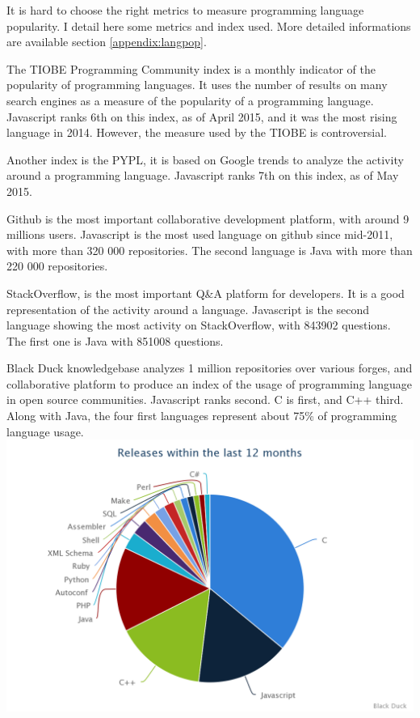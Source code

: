 It is hard to choose the right metrics to measure programming language popularity.
I detail here some metrics and index used.
More detailed informations are available section \ref{appendix:langpop}.

The TIOBE Programming Community index is a monthly indicator of the popularity of programming languages.
It uses the number of results on many search engines as a measure of the popularity of a programming language.
Javascript ranks 6th on this index, as of April 2015, and it was the most rising language in 2014.
However, the measure used by the TIOBE is controversial.

Another index is the PYPL, it is based on Google trends to analyze the activity around a programming language.
Javascript ranks 7th on this index, as of May 2015.



Github is the most important collaborative development platform, with around 9 millions users.
Javascript is the most used language on github since mid-2011, with more than 320 000 repositories.
The second language is Java with more than 220 000 repositories.


StackOverflow, is the most important Q\&A platform for developers.
It is a good representation of the activity around a language.
Javascript is the second language showing the most activity on StackOverflow, with 843902 questions.
The first one is Java with 851008 questions.


Black Duck knowledgebase analyzes 1 million repositories over various forges, and collaborative platform to produce an index of the usage of programming language in open source communities.
Javascript ranks second.
C is first, and C++ third.
Along with Java, the four first languages represent about 75\% of programming language usage.
\includegraphics[width=\linewidth]{../../data/js-trends/black-duck-15}

